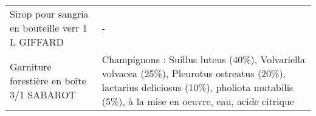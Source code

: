 \begin{longtable}{p{5cm}p{10cm}}
                                                         Sirop pour sangria en bouteille verr 1 L GIFFARD &                                                                                                                                                                                                                                                                                                                                                                                                                                                                                                                                                                                                                                                                                                                                                                                                                                                                                                                                                                                                                                        - \\
                                                                Garniture forestière en boîte 3/1 SABAROT &                                                                                                                                                                                                                                                                                                                                                                                                                                                                                                                                                                                                                                                                                                                                                                                                                                                 Champignons : Suillus luteus (40\%), Volvariella volvacea (25\%), Pleurotus ostreatus (20\%), lactarius deliciosus (10\%), pholiota mutabilis (5\%), à la mise en oeuvre, eau, acide citrique \\

\end{longtable}

